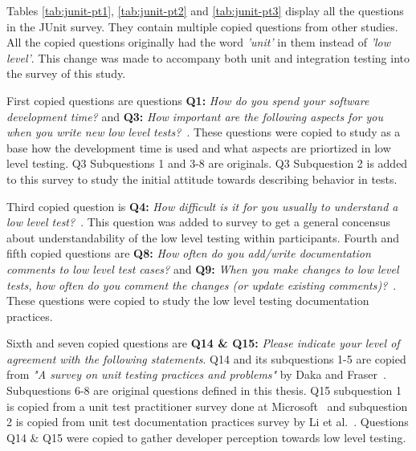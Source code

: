 \restoregeometry
Tables \ref{tab:junit-pt1}, \ref{tab:junit-pt2} and \ref{tab:junit-pt3} display all the questions in the JUnit survey.
They contain multiple copied questions from other
studies. All the copied questions originally had the word \textit{'unit'} in them instead of \textit{'low level'}. This change
was made to accompany both unit and integration testing into the survey of this study.

First copied questions are questions \textbf{Q1:} \textit{How do you spend your software development time?} and
\textbf{Q3:} \textit{How important are the following aspects for you when you write new low level tests?}~\cite{daka2014survey}.
These questions were copied to study as a base how the development time is used and what aspects are priortized in low level testing.
Q3 Subquestions 1 and 3-8 are originals. Q3 Subquestion 2 is added to this survey to study the initial attitude towards describing behavior
in tests.

Third copied question is \textbf{Q4:} \textit{How difficult is it for you usually to understand a low level test?}~\cite{li2016automatically}.
This question was added to survey to get a general concensus about understandability of the low level testing within participants.
Fourth and fifth copied questions are \textbf{Q8:} \textit{How often do you add/write documentation comments to low level test cases?} and
\textbf{Q9:} \textit{When you make changes to low level tests, how often do you comment the changes (or update existing comments)?}~\cite{li2016automatically}.
These questions were copied to study the low level testing documentation practices.

Sixth and seven copied questions are \textbf{Q14 \& Q15:} \textit{Please indicate your level of agreement with the following statements}.
Q14 and its subquestions 1-5 are copied from \textit{"A survey on unit testing practices and problems"} by Daka and Fraser~\cite{daka2014survey}.
Subquestions 6-8 are original questions defined in this thesis. Q15 subquestion 1 is copied from a unit test practitioner
survey done at Microsoft~\cite{williams2009effectiveness} and subquestion 2 is copied from unit test documentation
practices survey by Li et al.~\cite{li2016automatically}. Questions Q14 \& Q15 were copied to gather developer perception
towards low level testing.



